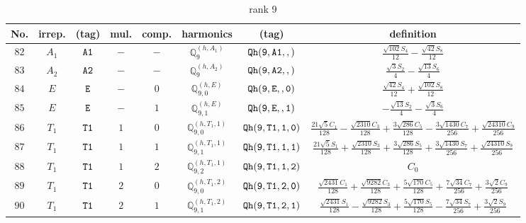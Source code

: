 \documentclass[fleqn,8pt]{jsarticle}
\begin{document}
\begin{table}[ht!]
\begin{center}
\caption{rank 9}
\renewcommand{\arraystretch}{1.3}
\begin{tabular}{cccccccc} \hline \hline
No. & irrep. & (tag) & mul. & comp. & harmonics & (tag) & definition \\ \hline
$ 82 $ & $ A_{1} $ & $ {\tt A1} $ & $ - $ & $ - $ & $ \mathbb{Q}_{9}^{(h,A_{1})} $ & $ {\tt Qh(9,A1,,)} $ & $ \frac{\sqrt{102} S_{4}}{12} - \frac{\sqrt{42} S_{8}}{12} $ \\
$ 83 $ & $ A_{2} $ & $ {\tt A2} $ & $ - $ & $ - $ & $ \mathbb{Q}_{9}^{(h,A_{2})} $ & $ {\tt Qh(9,A2,,)} $ & $ \frac{\sqrt{3} S_{2}}{4} - \frac{\sqrt{13} S_{6}}{4} $ \\
$ 84 $ & $ E $ & $ {\tt E} $ & $ - $ & $ 0 $ & $ \mathbb{Q}_{9,0}^{(h,E)} $ & $ {\tt Qh(9,E,,0)} $ & $ \frac{\sqrt{42} S_{4}}{12} + \frac{\sqrt{102} S_{8}}{12} $ \\
$ 85 $ & $ E $ & $ {\tt E} $ & $ - $ & $ 1 $ & $ \mathbb{Q}_{9,1}^{(h,E)} $ & $ {\tt Qh(9,E,,1)} $ & $ - \frac{\sqrt{13} S_{2}}{4} - \frac{\sqrt{3} S_{6}}{4} $ \\
$ 86 $ & $ T_{1} $ & $ {\tt T1} $ & $ 1 $ & $ 0 $ & $ \mathbb{Q}_{9,0}^{(h,T_{1},1)} $ & $ {\tt Qh(9,T1,1,0)} $ & $ \frac{21 \sqrt{5} C_{1}}{128} - \frac{\sqrt{2310} C_{3}}{128} + \frac{3 \sqrt{286} C_{5}}{128} - \frac{3 \sqrt{1430} C_{7}}{256} + \frac{\sqrt{24310} C_{9}}{256} $ \\
$ 87 $ & $ T_{1} $ & $ {\tt T1} $ & $ 1 $ & $ 1 $ & $ \mathbb{Q}_{9,1}^{(h,T_{1},1)} $ & $ {\tt Qh(9,T1,1,1)} $ & $ \frac{21 \sqrt{5} S_{1}}{128} + \frac{\sqrt{2310} S_{3}}{128} + \frac{3 \sqrt{286} S_{5}}{128} + \frac{3 \sqrt{1430} S_{7}}{256} + \frac{\sqrt{24310} S_{9}}{256} $ \\
$ 88 $ & $ T_{1} $ & $ {\tt T1} $ & $ 1 $ & $ 2 $ & $ \mathbb{Q}_{9,2}^{(h,T_{1},1)} $ & $ {\tt Qh(9,T1,1,2)} $ & $ C_{0} $ \\
$ 89 $ & $ T_{1} $ & $ {\tt T1} $ & $ 2 $ & $ 0 $ & $ \mathbb{Q}_{9,0}^{(h,T_{1},2)} $ & $ {\tt Qh(9,T1,2,0)} $ & $ \frac{\sqrt{2431} C_{1}}{128} + \frac{\sqrt{9282} C_{3}}{128} + \frac{5 \sqrt{170} C_{5}}{128} + \frac{7 \sqrt{34} C_{7}}{256} + \frac{3 \sqrt{2} C_{9}}{256} $ \\
$ 90 $ & $ T_{1} $ & $ {\tt T1} $ & $ 2 $ & $ 1 $ & $ \mathbb{Q}_{9,1}^{(h,T_{1},2)} $ & $ {\tt Qh(9,T1,2,1)} $ & $ \frac{\sqrt{2431} S_{1}}{128} - \frac{\sqrt{9282} S_{3}}{128} + \frac{5 \sqrt{170} S_{5}}{128} - \frac{7 \sqrt{34} S_{7}}{256} + \frac{3 \sqrt{2} S_{9}}{256} $ \\

\end{tabular}
\end{center}
\end{table}
\end{document}
